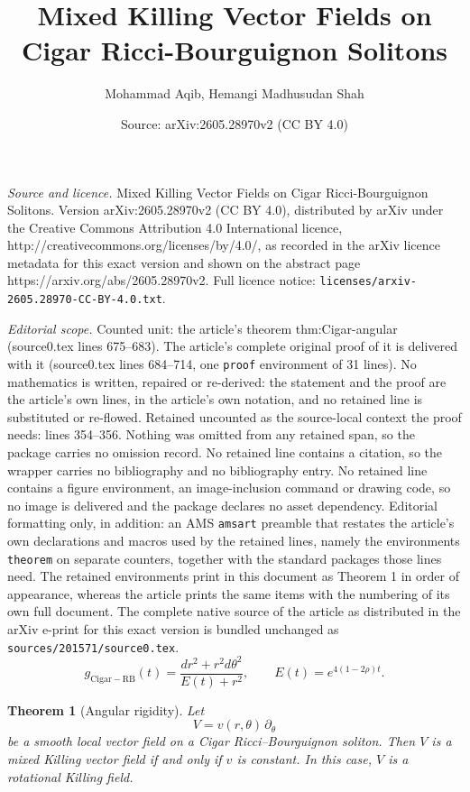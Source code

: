 \documentclass[10pt,a4paper]{amsart}
\title{Mixed Killing Vector Fields on Cigar Ricci-Bourguignon Solitons}
\author{Mohammad Aqib, Hemangi Madhusudan Shah}
\date{Source: arXiv:2605.28970v2 (CC BY 4.0)}
\newtheorem{theorem}{Theorem}
\begin{document}
\maketitle

\noindent\emph{Source and licence.} Mixed Killing Vector Fields on Cigar Ricci-Bourguignon Solitons. Version arXiv:2605.28970v2 (CC BY 4.0), distributed by arXiv under the Creative Commons Attribution 4.0 International licence, http://creativecommons.org/licenses/by/4.0/, as recorded in the arXiv licence metadata for this exact version and shown on the abstract page https://arxiv.org/abs/2605.28970v2. Full licence notice: \texttt{licenses/arxiv-2605.28970-CC-BY-4.0.txt}.\par\smallskip

\noindent\textit{Editorial scope.} Counted unit: the article's theorem thm:Cigar-angular (source0.tex lines 675--683). The article's complete original proof of it is delivered with it (source0.tex lines 684--714, one \texttt{proof} environment of 31 lines). No mathematics is written, repaired or re-derived: the statement and the proof are the article's own lines, in the article's own notation, and no retained line is substituted or re-flowed.  Retained uncounted as the source-local context the proof needs: lines 354--356.  Nothing was omitted from any retained span, so the package carries no omission record.  No retained line contains a citation, so the wrapper carries no bibliography and no bibliography entry.  No retained line contains a figure environment, an image-inclusion command or drawing code, so no image is delivered and the package declares no asset dependency.  Editorial formatting only, in addition: an AMS \texttt{amsart} preamble that restates the article's own declarations and macros used by the retained lines, namely the environments \texttt{theorem} on separate counters, together with the standard packages those lines need.  The retained environments print in this document as Theorem 1 in order of appearance, whereas the article prints the same items with the numbering of its own full document.  The complete native source of the article as distributed in the arXiv e-print for this exact version is bundled unchanged as \texttt{sources/201571/source0.tex}.
\begin{equation}\label{Cigar1}
g_{\mathrm{Cigar-RB}}(t) =   \frac{dr^2 + r^2 d\theta^2}{E(t) + r^2}, \qquad   E(t)=e^{4(1-2\rho)t}.
\end{equation}

\begin{theorem}[Angular rigidity]\label{thm:Cigar-angular}
Let
\[
V = v(r, \theta)\,\partial_\theta
\]
be a smooth local vector field on a Cigar Ricci--Bourguignon soliton.
Then $V$ is a mixed Killing vector field if and only if $v$ is constant.
In this case, $V$ is a rotational Killing field. 
\end{theorem}
\end{document}

